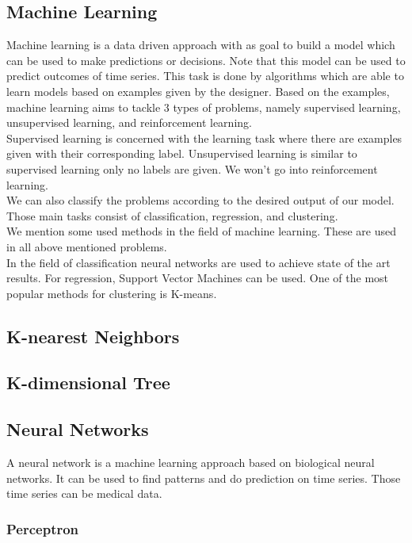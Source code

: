 	\subsection{Machine Learning}
Machine learning is a data driven approach with as goal to build a model which can be	used to make predictions or decisions. Note that this model can be used to predict outcomes of time series. This task is done by algorithms which are able to learn models based on examples given by the designer. Based on the examples, machine learning aims to tackle $3$ types of problems, namely supervised learning, unsupervised learning, and reinforcement learning. \\
Supervised learning is concerned with the learning task where there are examples given with their corresponding label. Unsupervised learning is similar to supervised learning only no labels are given. We won't go into reinforcement learning. \\
We can also classify the problems according to the desired output of our model. Those main tasks consist of classification, regression, and clustering. \\
	
We mention some used methods in the field of machine learning. These are used in all above mentioned problems. \\
In the field of classification neural networks are used to achieve state of the art results. For regression, Support Vector Machines can be used. One of the most popular methods for clustering is K-means. 

	\subsection{K-nearest Neighbors}
	
	
	
	\subsection{K-dimensional Tree}
	
	
	\subsection{Neural Networks}
	
A neural network is a machine learning approach based on biological neural networks. It can be used to find patterns and do prediction on time series. Those time series can be medical data.


		\subsubsection{Perceptron}

